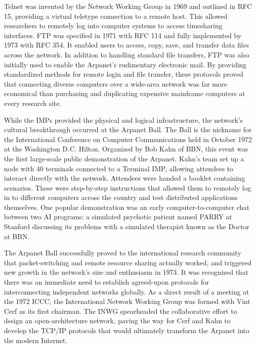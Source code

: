 Telnet was invented by the Network Working Group in 1969 and outlined in RFC 15, providing a virtual teletype connection to a remote host. This allowed researchers to remotely log into computer systems to access timesharing interfaces. FTP was specified in 1971 with RFC 114 and fully implemented by 1973 with RFC 354. It enabled users to access, copy, save, and transfer data files across the network. In addition to handling standard file transfers, FTP was also initially used to enable the Arpanet's rudimentary electronic mail. By providing standardized methods for remote login and file transfer, these protocols proved that connecting diverse computers over a wide-area network was far more economical than purchasing and duplicating expensive mainframe computers at every research site.

While the IMPs provided the physical and logical infrastructure, the network's cultural breakthrough occurred at the Arpanet Ball. The Ball is the nickname for the International Conference on Computer Communications held in October 1972 at the Washington D.C. Hilton. Organized by Bob Kahn of BBN, this event was the first large-scale public demonstration of the Arpanet. Kahn's team set up a node with 40 terminals connected to a Terminal IMP, allowing attendees to interact directly with the network. Attendees were handed a booklet containing scenarios. These were step-by-step instructions that allowed them to remotely log in to different computers across the country and test distributed applications themselves. One popular demonstration was an early computer-to-computer chat between two AI programs: a simulated psychotic patient named PARRY at Stanford discussing its problems with a simulated therapist known as the Doctor at BBN.

The Arpanet Ball successfully proved to the international research community that packet-switching and remote resource sharing actually worked, and triggered new growth in the network's size and enthusiasm in 1973. It was recognized that there was an immediate need to establish agreed-upon protocols for interconnecting independent networks globally. As a direct result of a meeting at the 1972 ICCC, the International Network Working Group was formed with Vint Cerf as its first chairman. The INWG spearheaded the collaborative effort to design an open-architecture network, paving the way for Cerf and Kahn to develop the TCP/IP protocols that would ultimately transform the Arpanet into the modern Internet.

